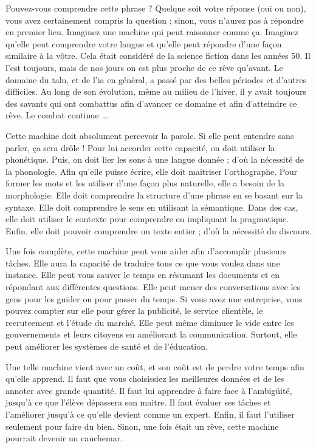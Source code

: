 \documentclass{KodeBook}
\begin{document}
\newpage 
\begin{discussion}

Pouvez-vous comprendre cette phrase ? 
Quelque soit votre réponse (oui ou non), vous avez certainement compris la question ; sinon, vous n'aurez pas à répondre en premier lieu. 
Imaginez une machine qui peut raisonner comme ça. 
Imaginez qu'elle peut comprendre votre langue et qu'elle peut répondre d'une façon similaire à la vôtre. 
Cela était considéré de la science fiction dans les années 50.
Il l'est toujours, mais de nos jours on est plus proche de ce rêve qu'avant. 
Le domaine du \ac{taln}, et de l'\ac{ia} en général, a passé par des belles périodes et d'autres difficiles. 
Au long de son évolution, même au milieu de l'hiver, il y avait toujours des savants qui ont combattus afin d'avancer ce domaine et afin d'atteindre ce rêve. 
Le combat continue ...

Cette machine doit absolument percevoir la parole.
Si elle peut entendre sans parler, ça sera drôle !
Pour lui accorder cette capacité, on doit utiliser la phonétique. 
Puis, on doit lier les sons à une langue donnée ; d'où la nécessité de la phonologie.
Afin qu'elle puisse écrire, elle doit maitriser l'orthographe.
Pour former les mots et les utiliser d'une façon plus naturelle, elle a besoin de la morphologie.
Elle doit comprendre la structure d'une phrase en se basant sur la syntaxe. 
Elle doit comprendre le sens en utilisant la sémantique.
Dans des cas, elle doit utiliser le contexte pour comprendre en impliquant la pragmatique. 
Enfin, elle doit pouvoir comprendre un texte entier ; d'où la nécessité du discours.

Une fois complète, cette machine peut vous aider afin d'accomplir plusieurs tâches. 
Elle aura la capacité de traduire tous ce que vous voulez dans une instance.
Elle peut vous sauver le temps en résumant les documents et en répondant aux différentes questions.
Elle peut mener des conversations avec les gens pour les guider ou pour passer du temps.
Si vous avez une entreprise, vous pouvez compter sur elle pour gérer la publicité, le service clientèle, le recruteement et l'étude du marché. 
Elle peut même diminuer le vide entre les gouvernements et leurs citoyens en améliorant la communication. 
Surtout, elle peut améliorer les systèmes de santé et de l'éducation.

Une telle machine vient avec un coût, et son coût est de perdre votre temps afin qu'elle apprend. 
Il faut que vous choisissiez les meilleures données et de les annoter avec grande quantité. 
Il faut lui apprendre à faire face à l'ambigüité, jusqu'à ce que l'élève dépassera son maitre.
Il faut évaluer ses tâches et l'améliorer jusqu'à ce qu'elle devient comme un expert. 
Enfin, il faut l'utiliser seulement pour faire du bien. 
Sinon, une fois était un rêve, cette machine pourrait devenir un cauchemar.

\end{discussion}

\ifx\wholebook\relax\else
% 
% 
	
\end{document}
